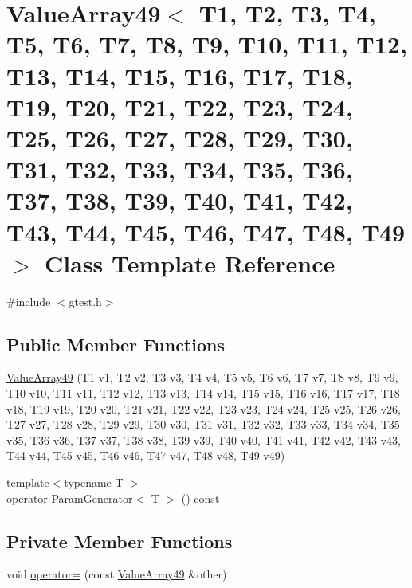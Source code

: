 \hypertarget{classtesting_1_1internal_1_1ValueArray49}{\section{\-Value\-Array49$<$ \-T1, \-T2, \-T3, \-T4, \-T5, \-T6, \-T7, \-T8, \-T9, \-T10, \-T11, \-T12, \-T13, \-T14, \-T15, \-T16, \-T17, \-T18, \-T19, \-T20, \-T21, \-T22, \-T23, \-T24, \-T25, \-T26, \-T27, \-T28, \-T29, \-T30, \-T31, \-T32, \-T33, \-T34, \-T35, \-T36, \-T37, \-T38, \-T39, \-T40, \-T41, \-T42, \-T43, \-T44, \-T45, \-T46, \-T47, \-T48, \-T49 $>$ \-Class \-Template \-Reference}
\label{dc/dd7/classtesting_1_1internal_1_1ValueArray49}
}


{\ttfamily \#include $<$gtest.\-h$>$}

\subsection*{\-Public \-Member \-Functions}
\begin{DoxyCompactItemize}
\item 
\hyperlink{classtesting_1_1internal_1_1ValueArray49_a9d7021e3bf39c25dc838f6b9f0b7c36f}{\-Value\-Array49} (\-T1 v1, \-T2 v2, \-T3 v3, \-T4 v4, \-T5 v5, \-T6 v6, \-T7 v7, \-T8 v8, \-T9 v9, \-T10 v10, \-T11 v11, \-T12 v12, \-T13 v13, \-T14 v14, \-T15 v15, \-T16 v16, \-T17 v17, \-T18 v18, \-T19 v19, \-T20 v20, \-T21 v21, \-T22 v22, \-T23 v23, \-T24 v24, \-T25 v25, \-T26 v26, \-T27 v27, \-T28 v28, \-T29 v29, \-T30 v30, \-T31 v31, \-T32 v32, \-T33 v33, \-T34 v34, \-T35 v35, \-T36 v36, \-T37 v37, \-T38 v38, \-T39 v39, \-T40 v40, \-T41 v41, \-T42 v42, \-T43 v43, \-T44 v44, \-T45 v45, \-T46 v46, \-T47 v47, \-T48 v48, \-T49 v49)
\item 
{\footnotesize template$<$typename T $>$ }\\\hyperlink{classtesting_1_1internal_1_1ValueArray49_a08ef46fa12c9dd8ef6fc630baeea89b7}{operator Param\-Generator$<$ T $>$} () const 
\end{DoxyCompactItemize}
\subsection*{\-Private \-Member \-Functions}
\begin{DoxyCompactItemize}
\item 
void \hyperlink{classtesting_1_1internal_1_1ValueArray49_abbf2fe80f52a190705e08603089585b6}{operator=} (const \hyperlink{classtesting_1_1internal_1_1ValueArray49}{\-Value\-Array49} \&other)
\end{DoxyCompactItemize}
